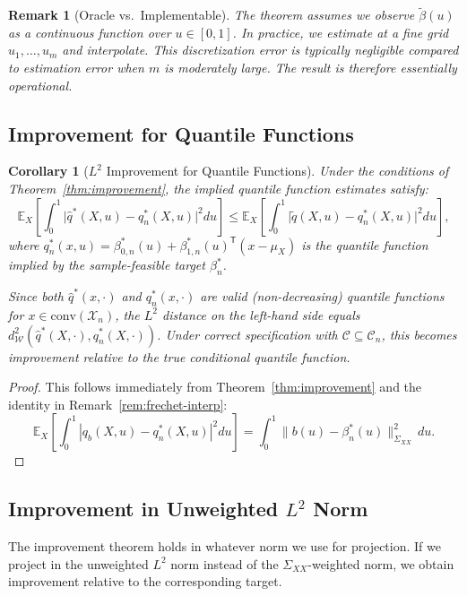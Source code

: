 \documentclass[12pt]{article}
\newcommand{\E}{\mathbb{E}}
\newcommand{\T}{\mathsf{T}}
\newtheorem{corollary}{Corollary}
\newtheorem{remark}{Remark}
\begin{document}
\begin{remark}[Oracle vs.\ Implementable]
The theorem assumes we observe $\tilde{\beta}(u)$ as a continuous function over $u \in [0,1]$. In practice, we estimate at a fine grid $u_1, \ldots, u_m$ and interpolate. This discretization error is typically negligible compared to estimation error when $m$ is moderately large. The result is therefore essentially operational.
\end{remark}

\subsection{Improvement for Quantile Functions}

\begin{corollary}[$L^2$ Improvement for Quantile Functions]\label{cor:qf-improvement}
Under the conditions of Theorem~\ref{thm:improvement}, the implied quantile function estimates satisfy:
\begin{equation}
\E_X\left[ \int_0^1 \big| \hat{q}^{*}(X, u) - q^*_n(X, u) \big|^2 du \right] \leq \E_X\left[ \int_0^1 \big| \tilde{q}(X, u) - q^*_n(X, u) \big|^2 du \right],
\end{equation}
where $q^*_n(x, u) = \beta_{0,n}^*(u) + \beta_{1,n}^*(u)^\T(x - \mu_X)$ is the quantile function implied by the sample-feasible target $\beta^*_n$.

Since both $\hat{q}^*(x, \cdot)$ and $q^*_n(x, \cdot)$ are valid (non-decreasing) quantile functions for $x \in \text{conv}(\mathcal{X}_n)$, the $L^2$ distance on the left-hand side equals $d_{\mathcal{W}}^2(\hat{q}^*(X, \cdot), q^*_n(X, \cdot))$. Under correct specification with $\mathcal{C} \subseteq \mathcal{C}_n$, this becomes improvement relative to the true conditional quantile function.
\end{corollary}

\begin{proof}
This follows immediately from Theorem~\ref{thm:improvement} and the identity in Remark~\ref{rem:frechet-interp}:
\[
\E_X\left[ \int_0^1 |q_b(X, u) - q^*_n(X, u)|^2 du \right] = \int_0^1 \|b(u) - \beta^*_n(u)\|_{\Sigma_{XX}}^2 \, du.
\]
\end{proof}

\subsection{Improvement in Unweighted $L^2$ Norm}

The improvement theorem holds in whatever norm we use for projection. If we project in the unweighted $L^2$ norm instead of the $\Sigma_{XX}$-weighted norm, we obtain improvement relative to the corresponding target.
\end{document}
